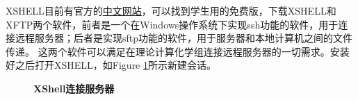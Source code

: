 \documentclass[12pt,a4paper,openany,twoside]{book}
\numberwithin{equation}{section}
\begin{document}
        XSHELL目前有官方的\href{https://www.netsarang.com/zh/xshell/}{中文网站}，可以找到学生用的免费版，下载XSHELL和XFTP两个软件，前者是一个在Windows操作系统下实现ssh功能的软件，用于连接远程服务器；后者是实现sftp功能的软件，用于服务器和本地计算机之间的文件传递。
        这两个软件可以满足在理论计算化学组连接远程服务器的一切需求。安装好之后打开XSHELL，如Figure \ref{Xshell}所示新建会话。
        \begin{figure}
          \centering
          \label{Xshell}
          \caption{\textbf{XShell连接服务器}}
        \end{figure}
      
\end{document}
